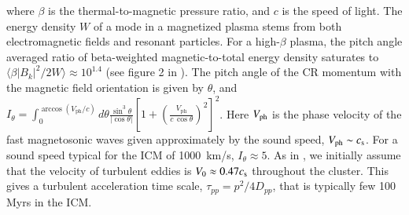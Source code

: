 \documentclass[useAMS,usenatbib]{mn2e}
\newcommand{\Vph}{V_\mathrm{ph}}
\begin{document}
where $\beta$ is the thermal-to-magnetic pressure ratio, and $c$
is the speed of light. The energy density $W$ of a mode in a
magnetized plasma stems from both electromagnetic fields and resonant
particles. For a high-$\beta$ plasma, the pitch angle averaged ratio of
beta-weighted magnetic-to-total energy density saturates to $\langle\beta
|B_k|^2/2W\rangle\approx 10^{1.4}$ (see figure 2 in
\cite{brunetti07}). The pitch angle of the CR momentum with the
magnetic field orientation is given by $\theta$, and
$I_\theta=\int_0^{\arccos(\Vph/c)} d\theta {\frac{ \sin^3 \theta }{
    |\cos \theta | }}
\left[1+\left(\frac{\Vph}{c\,\cos{\theta}}\right)^2\right]^2$. Here
$V_{\mathrm{ph}}$ is the phase velocity of the fast magnetosonic waves
given approximately by the sound speed, $\Vph \sim c_\rmn{s}$. For a sound
speed typical for the ICM of 1000~km/s, $I_\theta\approx5$. As in
\cite{brunetti07}, we initially assume that the velocity of turbulent
eddies is $V_0\approx 0.47 c_{\mathrm{s}}$ throughout the cluster. This gives a
turbulent acceleration time scale, $\tau_{pp} = p^2/4D_{pp}$, that is
typically few 100 Myrs in the ICM. 
\end{document}
